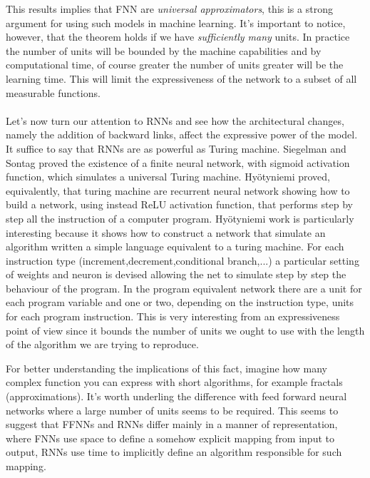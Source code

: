 This results implies that FNN are \textit{universal approximators}, this is a strong argument for using such models in machine learning.
It's important to notice, however, that the theorem holds if we have \textit{sufficiently many} units. In practice the number of units will be bounded
by the machine capabilities and by computational time, of course greater the number of units greater will be the learning time. This will limit
the expressiveness of the network to a subset of all measurable functions. 
\\\\Let's now turn our attention to RNNs and see how the architectural changes, namely the addition of backward links, affect the expressive power of the model.
It suffice to say that RNNs are as powerful as Turing machine. Siegelman and Sontag \cite{Siegelmann91turingcomputability} proved the existence 
of a finite neural network, with sigmoid activation function, which simulates a universal Turing machine. Hy{\"o}tyniemi \cite{Hyotyniemi96turingmachines} proved, equivalently,
that turing machine are recurrent neural network showing how to build a network, using instead ReLU activation function, that performs step by step 
all the instruction of a computer program.
Hy{\"o}tyniemi work is particularly interesting because it shows how to construct a network that simulate an algorithm written a simple language equivalent to a turing machine.
For each instruction type (increment,decrement,conditional branch,...) a particular setting of weights and neuron is devised allowing the net to simulate step by step the behaviour of the program. 
In the program equivalent network there are a unit for each program variable and one or two, depending on the instruction type, units for each program instruction.
This is very interesting from an expressiveness point of view since it bounds the number of units we ought to use with the length of the algorithm we are trying to reproduce.

For better understanding the implications of this fact, imagine how many complex function you can express with short algorithms, for example fractals (approximations).
It's worth underling the difference with feed forward neural networks where a large number of units seems to be required. This seems to suggest that FFNNs and RNNs differ mainly in a manner of 
representation, where FNNs use space to define a somehow explicit mapping from input to output, RNNs use time to implicitly define an algorithm responsible for such mapping. 

